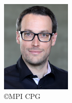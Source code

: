 
\begin{figure}
  \vspace{-12pt}
  \begin{centering}
    \includegraphics[width=0.3\textwidth]{img/sbalzarini.jpg}
  \end{centering}
  \caption*{\copyright MPI CPG}
  \vspace{-15pt}
\end{figure}

